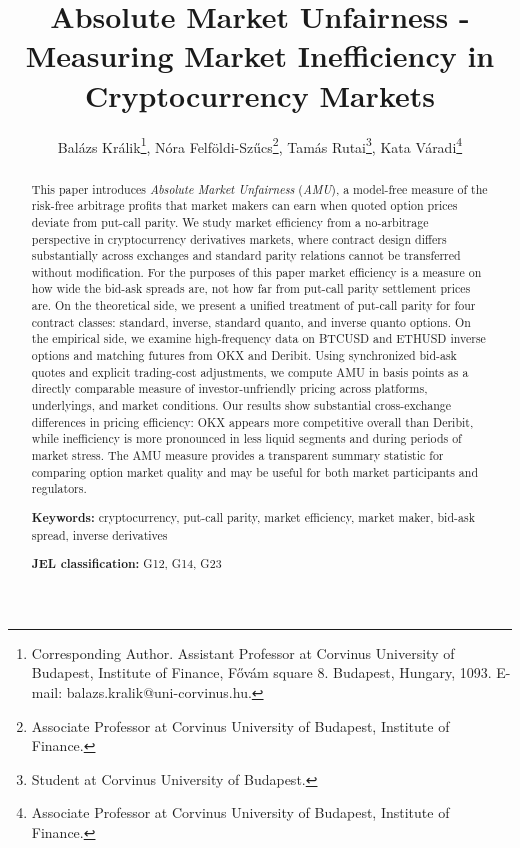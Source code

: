\documentclass[12pt]{article}
\begin{document}
\title{\textbf{Absolute Market Unfairness - Measuring Market Inefficiency in Cryptocurrency Markets}}

\author{Balázs Králik\thanks{Corresponding Author. Assistant Professor at Corvinus University of Budapest, Institute of Finance, Fővám square 8. Budapest, Hungary, 1093. E-mail: balazs.kralik@uni-corvinus.hu.}, Nóra Felföldi-Szűcs\thanks{Associate Professor at Corvinus University of Budapest, Institute of Finance.}, Tamás Rutai\thanks{Student at Corvinus University of Budapest.}, Kata Váradi\thanks{Associate Professor at Corvinus University of Budapest, Institute of Finance.}}
\date{}

\maketitle

\begin{abstract}

This paper introduces \textit{Absolute Market Unfairness} (\textit{AMU}), a model-free measure of the risk-free arbitrage profits that market makers can earn when quoted option prices deviate from put-call parity. We study market efficiency from a no-arbitrage perspective in cryptocurrency derivatives markets, where contract design differs substantially across exchanges and standard parity relations cannot be transferred without modification. For the purposes of this paper market efficiency is a measure on how wide the bid-ask spreads are, not how far from put-call parity settlement prices are. On the theoretical side, we present a unified treatment of put-call parity for four contract classes: standard, inverse, standard quanto, and inverse quanto options. On the empirical side, we examine high-frequency data on BTCUSD and ETHUSD inverse options and matching futures from OKX and Deribit. Using synchronized bid-ask quotes and explicit trading-cost adjustments, we compute AMU in basis points as a directly comparable measure of investor-unfriendly pricing across platforms, underlyings, and market conditions. Our results show substantial cross-exchange differences in pricing efficiency: OKX appears more competitive overall than Deribit, while inefficiency is more pronounced in less liquid segments and during periods of market stress. The AMU measure provides a transparent summary statistic for comparing option market quality and may be useful for both market participants and regulators.


\medskip

\textbf{Keywords:} cryptocurrency, put-call parity, market efficiency, market maker, bid-ask spread, inverse derivatives

\medskip

\textbf{JEL classification:} G12, G14, G23

\end{abstract}
\end{document}
